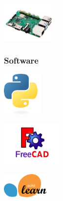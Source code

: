 \documentclass{beamer}
\begin{document}
\begin{frame}
\vspace{-0.5cm} %

\begin{center}
    \includegraphics[width=2.7cm]{figs/raspberry4.png}
\end{center}

\end{frame}


\begin{frame}
\frametitle{Software}

\centering

\begin{minipage}{0.3\textwidth}
    \centering
    \includegraphics[width=2.0cm]{figs/python.jpeg}
\end{minipage}
\hfill
\begin{minipage}{0.3\textwidth}
    \centering
    \includegraphics[width=3.0cm]{figs/freecad.png}
\end{minipage}
\hfill
\begin{minipage}{0.3\textwidth}
    \centering
    \includegraphics[width=2.3cm]{figs/sklearn.png}
\end{minipage}

\vspace{0.3cm} %



\end{frame}
\end{document}
